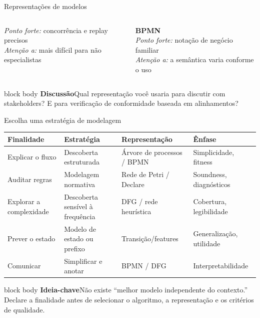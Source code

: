\documentclass[aspectratio=169,11pt]{beamer}
\newcommand{\keyidea}[1]{%
  \begin{beamercolorbox}[rounded=true,sep=0.65em]{block body}
    \textbf{\color{Teal}Ideia-chave}\quad #1
  \end{beamercolorbox}
}
\newcommand{\promptbox}[1]{%
  \begin{beamercolorbox}[rounded=true,sep=0.65em]{block body}
    \textbf{\color{Coral}Discussão}\quad #1
  \end{beamercolorbox}
}
\begin{document}
\begin{frame}[shrink=8]{Representações de modelos}
\begin{columns}[T,onlytextwidth]
      \textit{Ponto forte:} concorrência e replay precisos\\
      \textit{Atenção a:} mais difícil para não especialistas
      \centering
      \textbf{BPMN}\\[0.15cm]
      \textit{Ponto forte:} notação de negócio familiar\\
      \textit{Atenção a:} a semântica varia conforme o uso
  \end{columns}
  \vspace{0.4cm}
  \promptbox{Qual representação você usaria para discutir com stakeholders? E para verificação de conformidade baseada em alinhamentos?}
\end{frame}

\begin{frame}[shrink=4]{Escolha uma estratégia de modelagem}
  \small
  \begin{tabular}{@{}
    >{\raggedright\arraybackslash}p{}
    >{\raggedright\arraybackslash}p{}
    >{\raggedright\arraybackslash}p{}
    >{\raggedright\arraybackslash}p{}@{}}
    \toprule
    Finalidade & Estratégia & Representação & Ênfase\\
    \midrule
    Explicar o fluxo & Descoberta estruturada & Árvore de processos / BPMN & Simplicidade, fitness\\
    Auditar regras & Modelagem normativa & Rede de Petri / Declare & Soundness, diagnósticos\\
    Explorar a complexidade & Descoberta sensível à frequência & DFG / rede heurística & Cobertura, legibilidade\\
    Prever o estado & Modelo de estado ou prefixo & Transição/features & Generalização, utilidade\\
    Comunicar & Simplificar e anotar & BPMN / DFG & Interpretabilidade\\
    \bottomrule
  \end{tabular}
  \vspace{0.45cm}
  \keyidea{Não existe ``melhor modelo independente do contexto.'' Declare a finalidade antes de selecionar o algoritmo, a representação e os critérios de qualidade.}
\end{frame}
\end{document}
